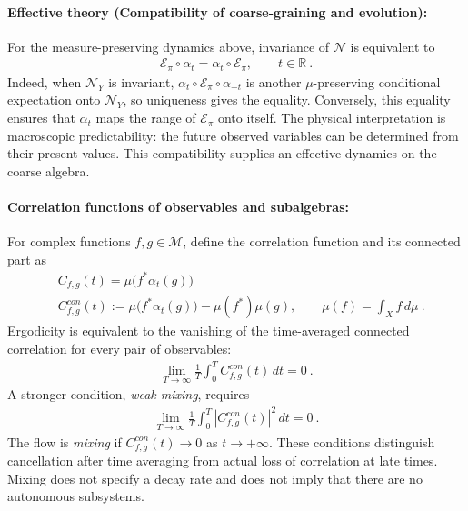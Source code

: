 \documentclass[a4paper,11pt]{article}
\theoremstyle{definition}
\newcommand{\nn}{\nonumber}
\newcommand{\mE}{\mathcal{E}}
\begin{document}

\paragraph{Effective theory (Compatibility of coarse-graining and evolution):}
For the measure-preserving dynamics above, invariance of $\mathcal N$ is equivalent to
\begin{align}\label{eq:classical-expectation-equivariance}
    \mE_{\pi}\circ\alpha_t=\alpha_t\circ \mE_{\pi},
    \qquad t\in\mathbb R\ .
\end{align}
Indeed, when $\mathcal N_Y$ is invariant, $\alpha_t\circ \mE_{\pi}\circ\alpha_{-t}$ is another $\mu$-preserving conditional expectation onto $\mathcal N_Y$, so uniqueness gives the equality. Conversely, this equality ensures that $\alpha_t$ maps the range of $\mE_{\pi}$ onto itself. The physical interpretation is macroscopic predictability: the future observed variables can be determined from their present values. This compatibility supplies an effective dynamics on the coarse algebra.


\paragraph{Correlation functions of observables and subalgebras:}
For complex functions $f,g\in\mathcal M$, define the correlation function and its connected part as
\begin{align}
    &C_{f,g}(t)=\mu\bigl(f^*\alpha_t(g)\bigr)\nn\\
    &C^{con}_{f,g}(t)
    :=\mu\bigl(f^*\alpha_t(g)\bigr)-\mu(f^*)\mu(g),
    \qquad \mu(f)=\int_X f\,d\mu\ .
\end{align}
Ergodicity is equivalent to the vanishing of the time-averaged connected correlation for every pair of observables:
\begin{align}
    \lim_{T\to\infty}\frac{1}{T}\int_0^T C^{con}_{f,g}(t)\,dt=0\ .
\end{align}
A stronger condition, {\it weak mixing}, requires
\begin{align}
    \lim_{T\to\infty}\frac{1}{T}\int_0^T |C^{con}_{f,g}(t)|^2\,dt=0\ .
\end{align}
The flow is {\it mixing} if $C^{con}_{f,g}(t)\to0$ as $t\to+\infty$. These conditions distinguish cancellation after time averaging from actual loss of correlation at late times. Mixing does not specify a decay rate and does not imply that there are no autonomous subsystems.
\end{document}
